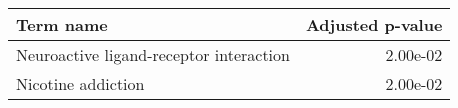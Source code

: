 \begin{tabular}{lr}
\toprule
                               Term name &  Adjusted p-value \\
\midrule
 Neuroactive ligand-receptor interaction &          2.00e-02 \\
                      Nicotine addiction &          2.00e-02 \\
\bottomrule
\end{tabular}
